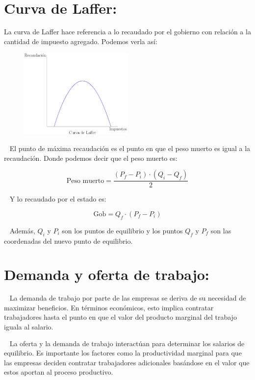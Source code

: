 \documentclass[
  letterpaper,
  DIV=11,
  numbers=noendperiod]{scrreport}
\begin{document}
\hypertarget{curva-de-laffer}{%
\section{Curva de Laffer:}\label{curva-de-laffer}}

La curva de Laffer hace referencia a lo recaudado por el gobierno con
relación a la cantidad de impuesto agregado. Podemos verla así:

\begin{figure}

{\centering \includegraphics[width=0.5\textwidth,height=\textheight]{4sistimpo_files/figure-pdf/unnamed-chunk-3-1.pdf}

}

\end{figure}

~ El punto de máxima recaudación es el punto en que el peso muerto es
igual a la recaudación. Donde podemos decir que el peso muerto es:

\[
\text{Peso muerto}=\frac{(P_f-P_i)\cdot (Q_i-Q_f)}{2}
\]

~ Y lo recaudado por el estado es:

\[
\text{Gob}=Q_f\cdot (P_f-P_i)
\]

~ Además, \(Q_i\) y \(P_i\) son los puntos de equilibrio y los puntos
\(Q_f\) y \(P_f\) son las coordenadas del nuevo punto de equilibrio.

\hypertarget{demanda-y-oferta-de-trabajo}{%
\section{Demanda y oferta de
trabajo:}\label{demanda-y-oferta-de-trabajo}}

~ La demanda de trabajo por parte de las empresas se deriva de su
necesidad de maximizar beneficios. En términos económicos, esto implica
contratar trabajadores hasta el punto en que el valor del producto
marginal del trabajo iguala al salario.

~ La oferta y la demanda de trabajo interactúan para determinar los
salarios de equilibrio. Es importante los factores como la productividad
marginal para que las empresas deciden contratar trabajadores
adicionales basándose en el valor que estos aportan al proceso
productivo.
\end{document}
